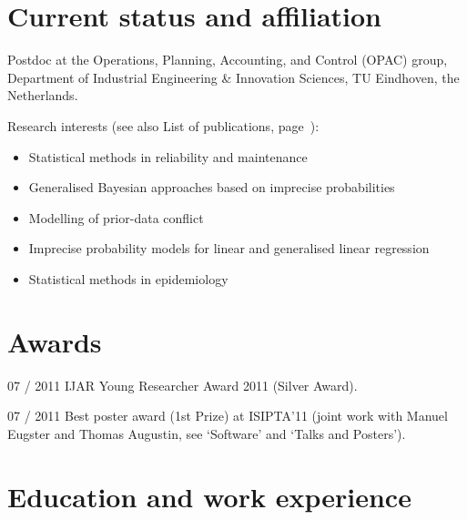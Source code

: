 \documentclass[a4paper]{simplecv}
\begin{document}
\vspace*{-2ex}
\section{Current status and affiliation}
\label{current}

Postdoc at the Operations, Planning, Accounting, and Control (OPAC) group,\\
Department of Industrial Engineering \& Innovation Sciences,
TU Eindhoven,
the Netherlands.

Research interests (see also List of publications, page~\pageref{publications}):
\begin{itemize}
\item Statistical methods in reliability and maintenance
\item Generalised Bayesian approaches based on imprecise probabilities
\item Modelling of prior-data conflict
\item Imprecise probability models for linear and generalised linear regression
\item Statistical methods in epidemiology
\end{itemize}



\section{Awards}
\label{awards}

\begin{topic}
\item[07 / 2011] IJAR Young Researcher Award 2011 (Silver Award).
\item[07 / 2011] Best poster award (1st Prize) at ISIPTA'11 
                 (joint work with Manuel Eugster and Thomas Augustin, see `Software' and `Talks and Posters').
\end{topic}




\newpage
\section{Education and work experience}
\label{education}

\end{document}
